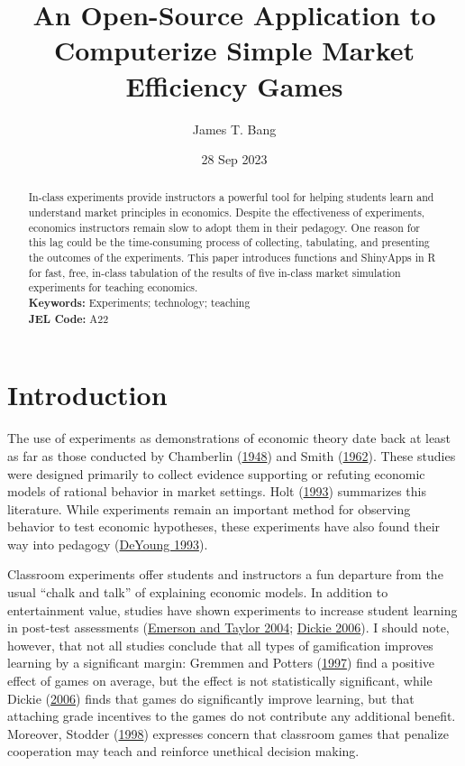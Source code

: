 \documentclass[
]{article}
\title{An Open-Source Application to Computerize Simple Market
Efficiency Games}
\author{James T. Bang}
\date{28 Sep 2023}
\begin{document}
\maketitle
\begin{abstract}
In-class experiments provide instructors a powerful tool for helping
students learn and understand market principles in economics. Despite
the effectiveness of experiments, economics instructors remain slow to
adopt them in their pedagogy. One reason for this lag could be the
time-consuming process of collecting, tabulating, and presenting the
outcomes of the experiments. This paper introduces functions and
ShinyApps in R for fast, free, in-class tabulation of the results of
five in-class market simulation experiments for teaching economics.\\
\textbf{Keywords:} Experiments; technology; teaching\\
\textbf{JEL Code:} A22
\end{abstract}

\newpage
{}
\setcounter{page}{1}

\hypertarget{introduction}{%
\section{Introduction}\label{introduction}}

The use of experiments as demonstrations of economic theory date back at
least as far as those conducted by Chamberlin
(\protect\hyperlink{ref-chamberlin_experimental_1948}{1948}) and Smith
(\protect\hyperlink{ref-smith_experimental_1962}{1962}). These studies
were designed primarily to collect evidence supporting or refuting
economic models of rational behavior in market settings. Holt
(\protect\hyperlink{ref-holt_industrial_1993}{1993}) summarizes this
literature. While experiments remain an important method for observing
behavior to test economic hypotheses, these experiments have also found
their way into pedagogy
(\protect\hyperlink{ref-deyoung_market_1993}{DeYoung 1993}).

Classroom experiments offer students and instructors a fun departure
from the usual ``chalk and talk'' of explaining economic models. In
addition to entertainment value, studies have shown experiments to
increase student learning in post-test assessments
(\protect\hyperlink{ref-emerson_comparing_2004}{Emerson and Taylor
2004}; \protect\hyperlink{ref-dickie_classroom_2006}{Dickie 2006}). I
should note, however, that not all studies conclude that all types of
gamification improves learning by a significant margin: Gremmen and
Potters (\protect\hyperlink{ref-gremmen_assessing_1997}{1997}) find a
positive effect of games on average, but the effect is not statistically
significant, while Dickie
(\protect\hyperlink{ref-dickie_classroom_2006}{2006}) finds that games
do significantly improve learning, but that attaching grade incentives
to the games do not contribute any additional benefit. Moreover, Stodder
(\protect\hyperlink{ref-stodder_experimental_1998}{1998}) expresses
concern that classroom games that penalize cooperation may teach and
reinforce unethical decision making.
\end{document}
